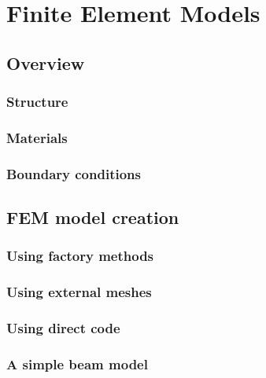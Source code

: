 \section{Finite Element Models}
\label{FEMModels:sec}

\subsection{Overview}

\subsubsection{Structure}

\subsubsection{Materials}

\subsubsection{Boundary conditions}

\subsection{FEM model creation}

\subsubsection{Using factory methods}

\subsubsection{Using external meshes}

\subsubsection{Using direct code}

\subsubsection{A simple beam model}

